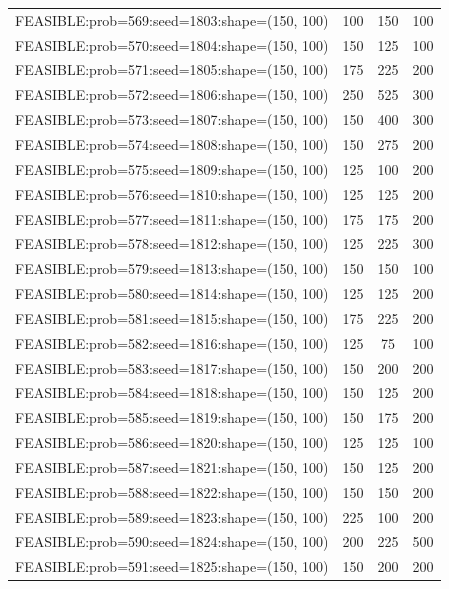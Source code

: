 \begin{longtable}{lccc}
FEASIBLE:prob=569:seed=1803:shape=(150, 100) &      100 &   150 &    100 \\
FEASIBLE:prob=570:seed=1804:shape=(150, 100) &      150 &   125 &    100 \\
FEASIBLE:prob=571:seed=1805:shape=(150, 100) &      175 &   225 &    200 \\
FEASIBLE:prob=572:seed=1806:shape=(150, 100) &      250 &   525 &    300 \\
FEASIBLE:prob=573:seed=1807:shape=(150, 100) &      150 &   400 &    300 \\
FEASIBLE:prob=574:seed=1808:shape=(150, 100) &      150 &   275 &    200 \\
FEASIBLE:prob=575:seed=1809:shape=(150, 100) &      125 &   100 &    200 \\
FEASIBLE:prob=576:seed=1810:shape=(150, 100) &      125 &   125 &    200 \\
FEASIBLE:prob=577:seed=1811:shape=(150, 100) &      175 &   175 &    200 \\
FEASIBLE:prob=578:seed=1812:shape=(150, 100) &      125 &   225 &    300 \\
FEASIBLE:prob=579:seed=1813:shape=(150, 100) &      150 &   150 &    100 \\
FEASIBLE:prob=580:seed=1814:shape=(150, 100) &      125 &   125 &    200 \\
FEASIBLE:prob=581:seed=1815:shape=(150, 100) &      175 &   225 &    200 \\
FEASIBLE:prob=582:seed=1816:shape=(150, 100) &      125 &    75 &    100 \\
FEASIBLE:prob=583:seed=1817:shape=(150, 100) &      150 &   200 &    200 \\
FEASIBLE:prob=584:seed=1818:shape=(150, 100) &      150 &   125 &    200 \\
FEASIBLE:prob=585:seed=1819:shape=(150, 100) &      150 &   175 &    200 \\
FEASIBLE:prob=586:seed=1820:shape=(150, 100) &      125 &   125 &    100 \\
FEASIBLE:prob=587:seed=1821:shape=(150, 100) &      150 &   125 &    200 \\
FEASIBLE:prob=588:seed=1822:shape=(150, 100) &      150 &   150 &    200 \\
FEASIBLE:prob=589:seed=1823:shape=(150, 100) &      225 &   100 &    200 \\
FEASIBLE:prob=590:seed=1824:shape=(150, 100) &      200 &   225 &    500 \\
FEASIBLE:prob=591:seed=1825:shape=(150, 100) &      150 &   200 &    200 \\

\end{longtable}
